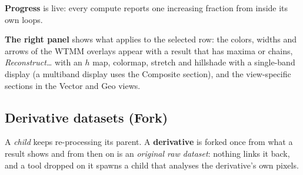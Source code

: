 \documentclass[10pt]{article}
\begin{document}


\textbf{Progress} is live: every compute reports one increasing fraction from inside its own
loops.

\textbf{The right panel} shows what applies to the selected row: the colors, widths and
arrows of the WTMM overlays appear with a result that has maxima or chains,
\emph{Reconstruct\ldots} with an $h$ map, colormap, stretch and hillshade with a single-band
display (a multiband display uses the Composite section), and the view-specific sections in
the Vector and Geo views.

\subsection*{Derivative datasets (Fork)}
A \emph{child} keeps re-processing its parent. A \textbf{derivative} is forked once from what a
result shows and from then on is an \emph{original raw dataset}: nothing links it back, and a
tool dropped on it spawns a child that analyses the derivative's own pixels.
\end{document}
